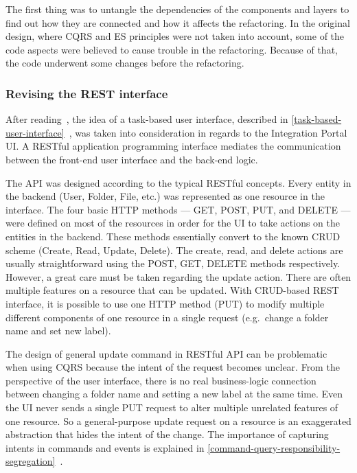 \documentclass{book}
\begin{document}
The first thing was to untangle the dependencies of the components and
layers to find out how they are connected and how it affects the
refactoring. In the original design, where CQRS and ES principles were
not taken into account, some of the code aspects were believed to cause
trouble in the refactoring. Because of that, the code underwent some
changes before the refactoring.

\subsubsection{Revising the REST
interface}\label{revising-the-rest-interface}

After reading~\cite{journey}, the idea of a task-based user interface,
described in \ref{task-based-user-interface}~, was taken into consideration in
regards to the Integration Portal UI. A RESTful application programming
interface mediates the communication between the front-end user
interface and the back-end logic.

The API was designed according to the typical RESTful concepts. Every
entity in the backend (User, Folder, File, etc.) was represented as one
resource in the interface. The four basic HTTP methods --- GET, POST,
PUT, and DELETE --- were defined on most of the resources in order for
the UI to take actions on the entities in the backend. These methods
essentially convert to the known CRUD scheme (Create, Read, Update,
Delete). The create, read, and delete actions are usually
straightforward using the POST, GET, DELETE methods respectively.
However, a great care must be taken regarding the update action. There
are often multiple features on a resource that can be updated. With
CRUD-based REST interface, it is possible to use one HTTP method (PUT)
to modify multiple different components of one resource in a single
request (e.g.~change a folder name and set new label).

The design of general update command in RESTful API can be problematic
when using CQRS because the intent of the request becomes unclear. From
the perspective of the user interface, there is no real business-logic
connection between changing a folder name and setting a new label at the
same time. Even the UI never sends a single PUT request to alter multiple
unrelated features of one resource. So a general-purpose update request
on a resource is an exaggerated abstraction that hides the intent of the
change. The importance of capturing intents in commands and events is
explained in \ref{command-query-responsibility-segregation}~.
\end{document}
